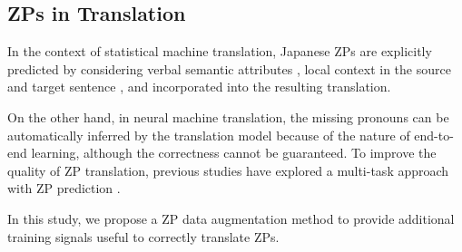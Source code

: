\subsection{ZPs in Translation}
In the context of statistical machine translation, Japanese ZPs are explicitly predicted by considering verbal semantic attributes \citep{nakaiwa-ikehara-1992-zero}, local context in the source and target sentence \citep{kudo-etal-2015-anlp}, and incorporated into the resulting translation.

On the other hand, in neural machine translation, the missing pronouns can be automatically inferred by the translation model because of the nature of end-to-end learning, although the correctness cannot be guaranteed. To improve the quality of ZP translation, previous studies have explored a multi-task approach with ZP prediction \citep{wang-etal-2016-novel,wang-etal-2019-one}.

In this study, we propose a ZP data augmentation method to provide additional training signals useful to correctly translate ZPs.
